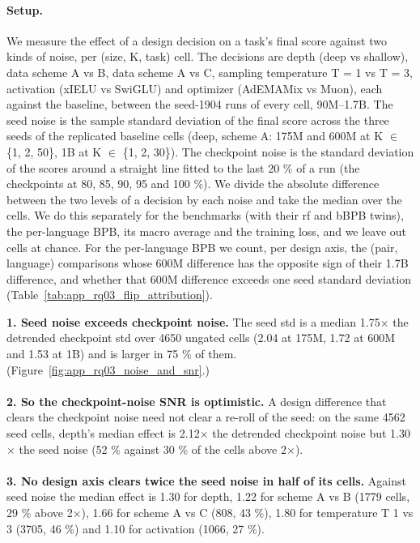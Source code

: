 {\begin{minipage}[t]{0.485\textwidth}
\paragraph{Setup.} We measure the effect of a design decision on a task's final score against two kinds of noise, per (size, K, task) cell. The decisions are depth (deep vs shallow), data scheme A vs B, data scheme A vs C, sampling temperature T = 1 vs T = 3, activation (xIELU vs SwiGLU) and optimizer (AdEMAMix vs Muon), each against the baseline, between the seed-1904 runs of every cell, 90M--1.7B. The seed noise is the sample standard deviation of the final score across the three seeds of the replicated baseline cells (deep, scheme A: 175M and 600M at K $\in$ \{1, 2, 50\}, 1B at K $\in$ \{1, 2, 30\}). The checkpoint noise is the standard deviation of the scores around a straight line fitted to the last 20 \% of a run (the checkpoints at 80, 85, 90, 95 and 100 \%). We divide the absolute difference between the two levels of a decision by each noise and take the median over the cells. We do this separately for the benchmarks (with their rf and bBPB twins), the per-language BPB, its macro average and the training loss, and we leave out cells at chance. For the per-language BPB we count, per design axis, the (pair, language) comparisons whose 600M difference has the opposite sign of their 1.7B difference, and whether that 600M difference exceeds one seed standard deviation (Table~\ref{tab:app_rq03_flip_attribution}).
\end{minipage}\hfill
\begin{minipage}[t]{0.485\textwidth}
\vspace{0pt}
\begin{rqfinding}
\textbf{1. Seed noise exceeds checkpoint noise.} The seed std is a median 1.75$\times$ the detrended checkpoint std over 4650 ungated cells (2.04 at 175M, 1.72 at 600M and 1.53 at 1B) and is larger in 75 \% of them. (Figure~\ref{fig:app_rq03_noise_and_snr}.)
\\
\\
\textbf{2. So the checkpoint-noise SNR is optimistic.} A design difference that clears the checkpoint noise need not clear a re-roll of the seed: on the same 4562 seed cells, depth's median effect is 2.12$\times$ the detrended checkpoint noise but 1.30$\times$ the seed noise (52 \% against 30 \% of the cells above 2$\times$).
\\
\\
\textbf{3. No design axis clears twice the seed noise in half of its cells.} Against seed noise the median effect is 1.30 for depth, 1.22 for scheme A vs B (1779 cells, 29 \% above 2$\times$), 1.66 for scheme A vs C (808, 43 \%), 1.80 for temperature T 1 vs 3 (3705, 46 \%) and 1.10 for activation (1066, 27 \%).
\end{rqfinding}
\end{minipage}

}
